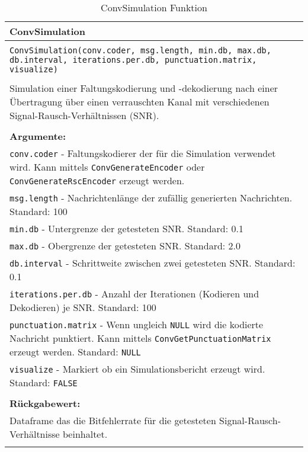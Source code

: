 \begin{longtable}{|p{\textwidth}|}
\hline
\rowcolor{lightblue}
ConvSimulation
\\
\hline
\\
\texttt{ConvSimulation(conv.coder, msg.length, min.db, max.db, db.interval, iterations.per.db, punctuation.matrix, visualize)}\\
\\
Simulation einer Faltungskodierung und -dekodierung nach einer Übertragung über einen verrauschten Kanal mit verschiedenen Signal-Rausch-Verhältnissen (SNR).\\
\\
\textbf{Argumente:}\\
\texttt{conv.coder} - Faltungskodierer der für die Simulation verwendet wird. Kann mittels \texttt{ConvGenerateEncoder} oder \texttt{ConvGenerateRscEncoder} erzeugt werden.\\
\texttt{msg.length} - Nachrichtenlänge der zufällig generierten Nachrichten. Standard: 100\\
\texttt{min.db} - Untergrenze der getesteten SNR. Standard: 0.1\\
\texttt{max.db} - Obergrenze der getesteten SNR. Standard: 2.0\\
\texttt{db.interval} - Schrittweite zwischen zwei getesteten SNR. Standard: 0.1\\
\texttt{iterations.per.db} - Anzahl der Iterationen (Kodieren und Dekodieren) je SNR. Standard: 100\\
\texttt{punctuation.matrix} - Wenn ungleich \texttt{NULL} wird die kodierte Nachricht punktiert. Kann mittels \texttt{ConvGetPunctuationMatrix} erzeugt werden. Standard: \texttt{NULL}\\
\texttt{visualize} - Markiert ob ein Simulationsbericht erzeugt wird. Standard: \texttt{FALSE}\\
\\
\textbf{Rückgabewert:}\\
Dataframe das die Bitfehlerrate für die getesteten Signal-Rausch-Verhältnisse beinhaltet.
\\
\hline
\caption{ConvSimulation Funktion}
\end{longtable}